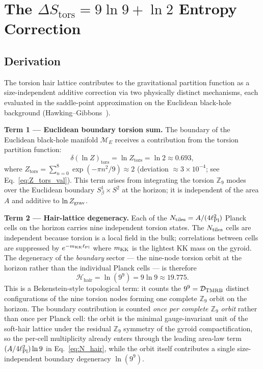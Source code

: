 \documentclass[11pt,a4paper]{article}
\begin{document}
\section{The $\Delta S_{\mathrm{tors}} = 9\ln 9 + \ln 2$ Entropy Correction}
\label{sec:entropy}

\subsection{Derivation}

The torsion hair lattice contributes to the gravitational partition function as
a size-independent additive correction via two physically distinct mechanisms,
each evaluated in the saddle-point approximation on the Euclidean black-hole
background (Hawking--Gibbons~\cite{GibbonsHawking1977}).

\textbf{Term 1 — Euclidean boundary torsion sum.}
The boundary of the Euclidean black-hole manifold $\mathcal{M}_E$ receives a
contribution from the torsion partition function:
\begin{equation}
  \delta(\ln Z)_{\mathrm{tors}} = \ln Z_{\mathrm{tors}} = \ln 2 \approx 0.693,
  \label{eq:lnZ_tors}
\end{equation}
where $Z_{\mathrm{tors}} = \sum_{n=0}^8 \exp(-\pi n^2/9) \approx 2$ (deviation ${\approx}3\times10^{-4}$;
see Eq.~\eqref{eq:Z_tors_val}).  This term arises from integrating the torsion
$\mathbb{Z}_9$ modes over the Euclidean boundary $S^1_\beta \times S^2$ at
the horizon; it is independent of the area $A$ and additive to $\ln Z_{\rm grav}$.

\textbf{Term 2 — Hair-lattice degeneracy.}
Each of the $N_{\rm tiles} = A/(4\ell_{\rm Pl}^2)$ Planck cells on the horizon
carries nine independent torsion states.  The $N_{\rm tiles}$ cells are
independent because torsion is a local field in the bulk; correlations between
cells are suppressed by $e^{-m_{\rm KK} \ell_{\rm Pl}}$ where $m_{\rm KK}$ is
the lightest KK mass on the gyroid.  The degeneracy of the \emph{boundary}
sector — the nine-node torsion orbit at the horizon rather than the individual
Planck cells — is therefore
\begin{equation}
  \mathcal{H}_{\mathrm{hair}} = \ln(9^9) = 9\ln 9 \approx 19.775.
  \label{eq:H_hair_sec4}
\end{equation}
This is a Bekenstein-style topological term: it counts the $9^9 = \mathcal{D}_{\rm TMRB}$
distinct configurations of the nine torsion nodes forming one complete
$\mathbb{Z}_9$ orbit on the horizon.  The boundary contribution is counted
\emph{once per complete $\mathbb{Z}_9$ orbit} rather than once per Planck
cell: the orbit is the minimal gauge-invariant unit of the soft-hair lattice
under the residual $\mathbb{Z}_9$ symmetry of the gyroid compactification, so
the per-cell multiplicity already enters through the leading area-law term
$(A/4\ell_{\rm Pl}^2)\ln 9$ in Eq.~\eqref{eq:N_hair}, while the orbit
itself contributes a single size-independent boundary degeneracy
$\ln(9^9)$.
\end{document}
